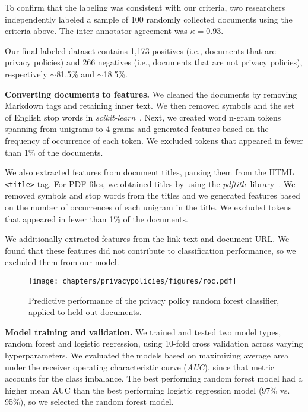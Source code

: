 To confirm that the labeling was consistent with our criteria, two researchers independently labeled a sample of 100 randomly collected documents using the criteria above. The inter-annotator agreement was $\kappa=0.93$.

Our final labeled dataset contains 1,173 positives (i.e., documents that are privacy policies) and 266 negatives (i.e., documents that are not privacy policies), respectively $\sim$81.5\% and $\sim$18.5\%.

\textbf{Converting documents to features.} We cleaned the documents by removing Markdown tags and retaining inner text. We then removed symbols and the set of English stop words in \emph{scikit-learn}~\cite{scikit-learn}. Next, we created word n-gram tokens spanning from unigrams to 4-grams and generated features based on the frequency of occurrence of each token. We excluded tokens that appeared in fewer than 1\% of the documents.

We also extracted features from document titles, parsing them from the HTML \texttt{<title>} tag. For PDF files, we obtained titles by using the \textit{pdftitle} library~\cite{pdftitle-pypi}.
We removed symbols and stop words from the titles and we generated features based on the number of occurrences of each unigram in the title. We excluded tokens that appeared in fewer than 1\% of the documents.

We additionally extracted features from the link text and document URL. We found that these features did not contribute to classification performance, so we excluded them from our model.

\begin{figure}[]
\centering
\texttt{[image: chapters/privacypolicies/figures/roc.pdf]}
\caption{Predictive performance of the privacy policy random forest classifier, applied to held-out documents.}
\label{fig:roc-auc}
\end{figure}

\textbf{Model training and validation.}
We trained and tested two model types, random forest and logistic regression, using 10-fold cross validation across varying hyperparameters. We evaluated the models based on maximizing average area under the receiver operating characteristic curve (\textit{AUC}), since that metric accounts for the class imbalance. The best performing random forest model had a higher mean AUC than the best performing logistic regression model (97\% vs. 95\%), so we selected the random forest model.

